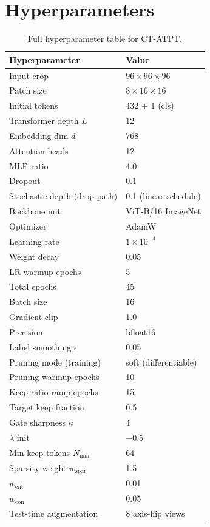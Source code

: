 \documentclass[journal]{IEEEtran}
\begin{document}
\section{Hyperparameters}\label{app:hyperparams}
\begin{table}[h]
\centering
\caption{Full hyperparameter table for CT-ATPT.}
\label{tab:hyperparams}
\begin{tabular}{ll}
\toprule
\textbf{Hyperparameter} & \textbf{Value} \\
\midrule
Input crop                  & $96 \times 96 \times 96$ \\
Patch size                  & $8 \times 16 \times 16$ \\
Initial tokens              & 432 + 1 (cls) \\
Transformer depth $L$       & 12 \\
Embedding dim $d$           & 768 \\
Attention heads             & 12 \\
MLP ratio                   & 4.0 \\
Dropout                     & 0.1 \\
Stochastic depth (drop path) & 0.1 (linear schedule) \\
Backbone init               & ViT-B/16 ImageNet \\
\midrule
Optimizer                   & AdamW \\
Learning rate               & $1 \times 10^{-4}$ \\
Weight decay                & 0.05 \\
LR warmup epochs            & 5 \\
Total epochs                & 45 \\
Batch size                  & 16 \\
Gradient clip               & 1.0 \\
Precision                   & bfloat16 \\
Label smoothing $\epsilon$  & 0.05 \\
\midrule
Pruning mode (training)     & soft (differentiable) \\
Pruning warmup epochs       & 10 \\
Keep-ratio ramp epochs      & 15 \\
Target keep fraction        & 0.5 \\
Gate sharpness $\kappa$     & 4 \\
$\lambda$ init              & $-0.5$ \\
Min keep tokens $N_{\min}$  & 64 \\
Sparsity weight $w_{\mathrm{spar}}$ & 1.5 \\
$w_{\mathrm{ent}}$          & 0.01 \\
$w_{\mathrm{con}}$          & 0.05 \\
\midrule
Test-time augmentation      & 8 axis-flip views \\
\bottomrule
\end{tabular}
\end{table}
\end{document}
